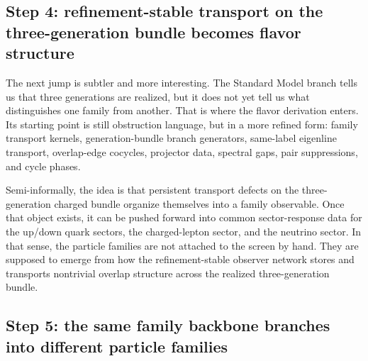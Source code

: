 \documentclass[11pt]{article}
\begin{document}
\subsection{Step 4: refinement-stable transport on the three-generation bundle becomes flavor structure}

The next jump is subtler and more interesting. The Standard Model branch tells us that three
generations are realized, but it does not yet tell us what distinguishes one family from another.
That is where the flavor derivation enters. Its starting point is still obstruction
language, but in a more refined form: family transport kernels, generation-bundle branch
generators, same-label eigenline transport, overlap-edge cocycles, projector data, spectral
gaps, pair suppressions, and cycle phases.

Semi-informally, the idea is that persistent transport defects on the three-generation charged
bundle organize themselves into a family observable. Once that object exists, it can be pushed
forward into common sector-response data for the up/down quark sectors, the charged-lepton
sector, and the neutrino sector. In that sense, the particle families are not attached to the
screen by hand. They are supposed to emerge from how the refinement-stable observer network
stores and transports nontrivial overlap structure across the realized three-generation bundle.

\subsection{Step 5: the same family backbone branches into different particle families}\label{step5-same-family-backbone-branches-into-different-particle-families}
\end{document}
